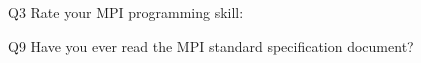 \begin{description}%
\item{Q3} Rate your MPI programming skill:%
\item{Q9} Have you ever read the MPI standard specification document?%
\end{description}%
